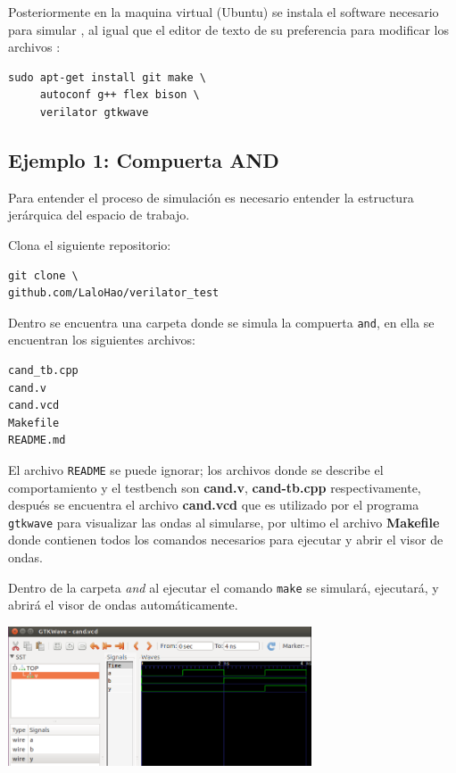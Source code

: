 \documentclass[11pt]{/home/hao/dev/org/latex-plantilla/IEEEtran}
\begin{document}
Posteriormente en la maquina virtual (Ubuntu) se instala el software
necesario para simular \cite{verilator-instalacion}, al igual que el
editor de texto de su preferencia para modificar los archivos :

\begin{verbatim}
sudo apt-get install git make \
     autoconf g++ flex bison \
     verilator gtkwave
\end{verbatim}
\subsection{Ejemplo 1: Compuerta AND}
\label{sec:org8721df7}
Para entender el proceso de simulación es necesario entender la
estructura jerárquica del espacio de trabajo.

Clona el siguiente repositorio:

\begin{verbatim}
git clone \
github.com/LaloHao/verilator_test
\end{verbatim}

Dentro se encuentra una carpeta donde se simula la compuerta \texttt{and},
en ella se encuentran los siguientes archivos:

\begin{verbatim}
cand_tb.cpp
cand.v
cand.vcd
Makefile
README.md
\end{verbatim}

El archivo \texttt{README} se puede ignorar; los archivos donde se
describe el comportamiento y el testbench son \textbf{cand.v},
\textbf{cand-tb.cpp} respectivamente, después se encuentra el archivo
\textbf{cand.vcd} que es utilizado por el programa \texttt{gtkwave} para
visualizar las ondas al simularse, por ultimo el archivo \textbf{Makefile}
donde contienen todos los comandos necesarios para ejecutar y abrir
el visor de ondas.

Dentro de la carpeta \emph{and} al ejecutar el comando \texttt{make} se
simulará, ejecutará, y abrirá el visor de ondas automáticamente.

\begin{center}
\includegraphics[width=9cm]{data/51/264eef-d888-4bbb-933e-983c0be58cb7/screenshot-20170217-105525.png}
\end{center}
\end{document}
